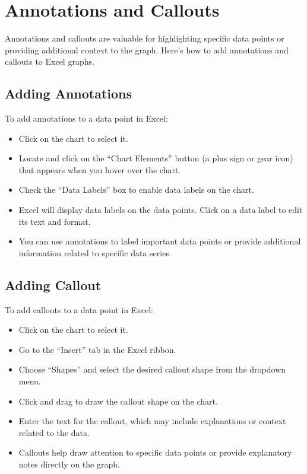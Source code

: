 \documentclass[
]{book}
\providecommand{\tightlist}{%
  \setlength{\itemsep}{0pt}\setlength{\parskip}{0pt}}
\begin{document}
\hypertarget{annotations-and-callouts}{%
\section{Annotations and Callouts}\label{annotations-and-callouts}}

Annotations and callouts are valuable for highlighting specific data points or providing additional context to the graph. Here's how to add annotations and callouts to Excel graphs.

\hypertarget{adding-annotations}{%
\subsection{Adding Annotations}\label{adding-annotations}}

To add annotations to a data point in Excel:

\begin{itemize}
\tightlist
\item
  Click on the chart to select it.
\item
  Locate and click on the ``Chart Elements'' button (a plus sign or gear icon) that appears when you hover over the chart.
\item
  Check the ``Data Labels'' box to enable data labels on the chart.
\item
  Excel will display data labels on the data points. Click on a data label to edit its text and format.
\item
  You can use annotations to label important data points or provide additional information related to specific data series.
\end{itemize}

\hypertarget{adding-callout}{%
\subsection{Adding Callout}\label{adding-callout}}

To add callouts to a data point in Excel:

\begin{itemize}
\tightlist
\item
  Click on the chart to select it.
\item
  Go to the ``Insert'' tab in the Excel ribbon.
\item
  Choose ``Shapes'' and select the desired callout shape from the dropdown menu.
\item
  Click and drag to draw the callout shape on the chart.
\item
  Enter the text for the callout, which may include explanations or context related to the data.
\item
  Callouts help draw attention to specific data points or provide explanatory notes directly on the graph.
\end{itemize}
\end{document}
